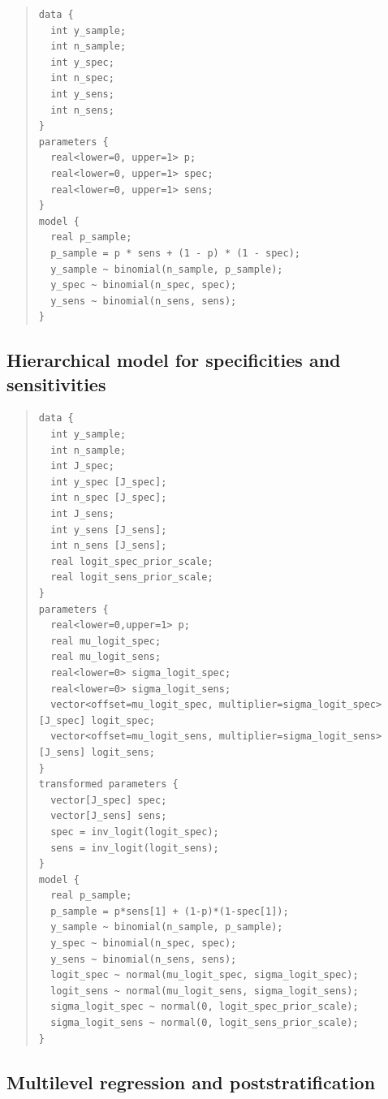 \documentclass[11pt]{article}
\begin{document}
    \begin{small}
  \begin{quotation}\noindent
\begin{verbatim}
data {
  int y_sample;
  int n_sample;
  int y_spec;
  int n_spec;
  int y_sens;
  int n_sens;
}
parameters {
  real<lower=0, upper=1> p;
  real<lower=0, upper=1> spec;
  real<lower=0, upper=1> sens;
}
model {
  real p_sample;
  p_sample = p * sens + (1 - p) * (1 - spec);
  y_sample ~ binomial(n_sample, p_sample);
  y_spec ~ binomial(n_spec, spec);
  y_sens ~ binomial(n_sens, sens);
}
\end{verbatim}
\end{quotation}
\end{small}
  
\subsection{Hierarchical model for specificities and sensitivities}\label{stan3}

  \begin{small}
  \begin{quotation}\noindent
\begin{verbatim}
data {
  int y_sample;
  int n_sample;
  int J_spec;
  int y_spec [J_spec];
  int n_spec [J_spec];
  int J_sens;
  int y_sens [J_sens];
  int n_sens [J_sens];
  real logit_spec_prior_scale;
  real logit_sens_prior_scale;
}
parameters {
  real<lower=0,upper=1> p;
  real mu_logit_spec;
  real mu_logit_sens;
  real<lower=0> sigma_logit_spec;
  real<lower=0> sigma_logit_sens;
  vector<offset=mu_logit_spec, multiplier=sigma_logit_spec>[J_spec] logit_spec;
  vector<offset=mu_logit_sens, multiplier=sigma_logit_sens>[J_sens] logit_sens;
}
transformed parameters {
  vector[J_spec] spec;
  vector[J_sens] sens;
  spec = inv_logit(logit_spec);
  sens = inv_logit(logit_sens);
}
model {
  real p_sample;
  p_sample = p*sens[1] + (1-p)*(1-spec[1]);
  y_sample ~ binomial(n_sample, p_sample);
  y_spec ~ binomial(n_spec, spec);
  y_sens ~ binomial(n_sens, sens);
  logit_spec ~ normal(mu_logit_spec, sigma_logit_spec);
  logit_sens ~ normal(mu_logit_sens, sigma_logit_sens);
  sigma_logit_spec ~ normal(0, logit_spec_prior_scale);
  sigma_logit_sens ~ normal(0, logit_sens_prior_scale);
}
\end{verbatim}
\end{quotation}
\end{small}

\subsection{Multilevel regression and poststratification}\label{stan4}
\end{document}
